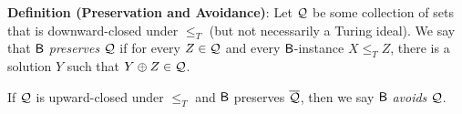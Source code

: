 \documentclass{amsart}
\begin{document}
	\noindent \textbf{Definition (Preservation and Avoidance)}: Let $\mathcal{Q}$ be some collection of sets that is downward-closed under $\leq_T$ (but not necessarily a Turing ideal). We say that $\sf{B}$ \textit{preserves} $\mathcal{Q}$ if for every $Z\in \mathcal{Q}$ and every $\sf{B}$-instance $X\leq_T Z$, there is a solution $Y$ such that $Y\oplus Z\in \mathcal{Q}$.
	
	If $\mathcal{Q}$ is upward-closed under $\leq_T$ and $\sf{B}$ preserves $\overline{\mathcal{Q}}$, then we say $\sf{B}$ \textit{avoids} $\mathcal{Q}$.\\
	
	
	
\end{document}
